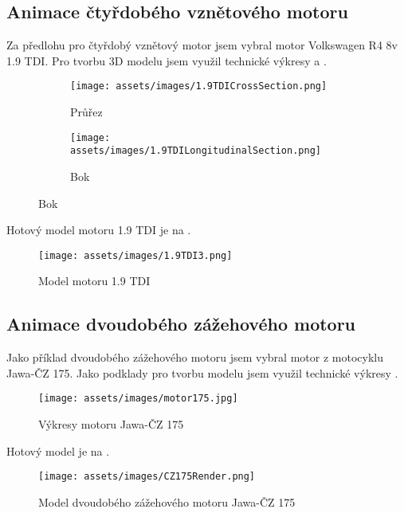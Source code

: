 \subsection{Animace čtyřdobého vznětového motoru}
{Za předlohu pro čtyřdobý vznětový motor jsem vybral motor Volkswagen R4 8v 1.9 TDI. Pro tvorbu 3D modelu jsem využil technické výkresy  a .}
\cite{VWGAG:RealizingFutureTrendsInDieselEngineDevelopment}
\begin{figure}[H]
    \begingroup
    \makeatletter
    \renewcommand\thesubfigure{\thefigure~--~\@nameuse{subfiglabel@\alph{subfigure}}}
    \newcommand{\subfiglabel@a}{vlevo}
    \newcommand{\subfiglabel@b}{vpravo}
    \captionsetup[subfigure]{labelformat=simple, labelsep=colon}
    \renewcommand\p@subfigure{}
    \makeatother
    \centering
    \begin{subfigure}{.5\textwidth}
        \centering
        \texttt{[image: assets/images/1.9TDICrossSection.png]}
        \caption{Průřez}
        \label{obr:1.9TDIvykresyPrurez}
    \end{subfigure}%
    \begin{subfigure}{.5\textwidth}
        \centering
        \texttt{[image: assets/images/1.9TDILongitudinalSection.png]}
        \caption{Bok}
        \label{obr:1.9TDIvykresyBok}
    \end{subfigure}
    \endgroup
\end{figure}
{Hotový model motoru 1.9 TDI je na .}
\begin{figure}[H]
    \centering
    \texttt{[image: assets/images/1.9TDI3.png]}
    \caption{Model motoru 1.9 TDI \jaObr}
    \label{obr:1.9TDImodel}
\end{figure}
\newpage
\subsection{Animace dvoudobého zážehového motoru}
{Jako příklad dvoudobého zážehového motoru jsem vybral motor z motocyklu Jawa-ČZ 175. Jako podklady pro tvorbu modelu jsem využil technické výkresy .}
\cite{MZ:CZ175}
\begin{figure}[H]
    \centering
    \texttt{[image: assets/images/motor175.jpg]}
    \caption{Výkresy motoru Jawa-ČZ 175}
    \label{obr:CZ175Vykres}
\end{figure}
{Hotový model je na .}
\begin{figure}[H]
    \centering
    \texttt{[image: assets/images/CZ175Render.png]}
    \caption{Model dvoudobého zážehového motoru Jawa-ČZ 175 \jaObr}
    \label{obr:CZ175Render}
\end{figure}
\newpage
